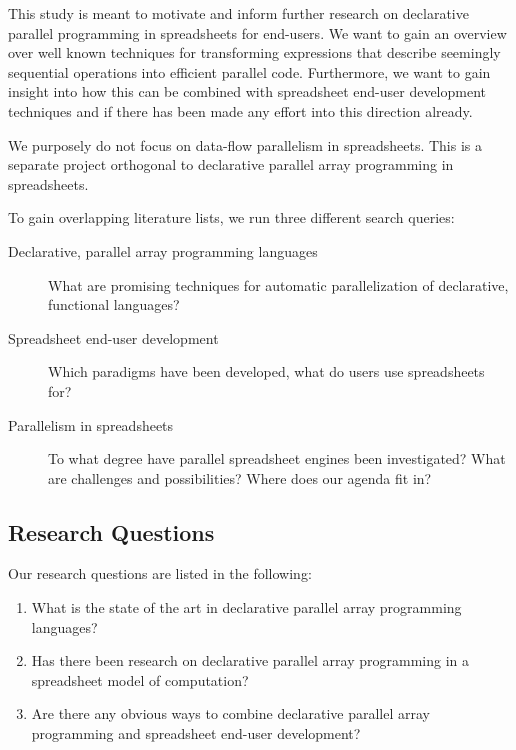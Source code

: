 \documentclass[a4paper]{article}
\begin{document}
This study is meant to motivate and inform further research on
declarative parallel programming in spreadsheets for end-users. We
want to gain an overview over well known techniques for transforming
expressions that describe seemingly sequential operations into
efficient parallel code. Furthermore, we want to gain insight into how
this can be combined with spreadsheet end-user development techniques
and if there has been made any effort into this direction
already. 

We purposely do not focus on data-flow parallelism in
spreadsheets. This is a separate project orthogonal to declarative
parallel array programming in spreadsheets.

To gain overlapping literature lists, we run three different search queries:

\begin{description}
\item[Declarative, parallel array programming languages] What are
  promising techniques for automatic parallelization of declarative,
  functional languages?
\item[Spreadsheet end-user development] Which paradigms have been
  developed, what do users use spreadsheets for?
\item[Parallelism in spreadsheets] To what degree have parallel
  spreadsheet engines been investigated? What are challenges and
  possibilities? Where does our agenda fit in?
\end{description}

\subsection{Research Questions}
\label{sec:research-questions}

Our research questions are listed in the following:

\begin{enumerate}
\item What is the state of the art in declarative parallel array
  programming languages?
\item Has there been research on declarative parallel array
  programming in a spreadsheet model of computation?
\item Are there any obvious ways to combine declarative parallel array
  programming and spreadsheet end-user development?
\end{enumerate}
\end{document}
